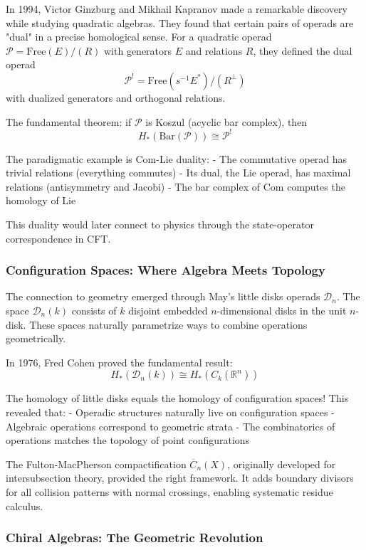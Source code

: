 In 1994, Victor Ginzburg and Mikhail Kapranov \cite{GK94} made a remarkable discovery while studying quadratic algebras. They found that certain pairs of operads are "dual" in a precise homological sense. For a quadratic operad $\mathcal{P} = \text{Free}(E)/(R)$ with generators $E$ and relations $R$, they defined the dual operad
$$\mathcal{P}^! = \text{Free}(s^{-1}E^*)/(R^\perp)$$
with dualized generators and orthogonal relations.

The fundamental theorem: if $\mathcal{P}$ is Koszul (acyclic bar complex), then
$$H_*(\text{Bar}(\mathcal{P})) \cong \mathcal{P}^!$$

The paradigmatic example is Com-Lie duality:
- The commutative operad has trivial relations (everything commutes)
- Its dual, the Lie operad, has maximal relations (antisymmetry and Jacobi)
- The bar complex of Com computes the homology of Lie

This duality would later connect to physics through the state-operator correspondence in CFT.

\subsubsection{Configuration Spaces: Where Algebra Meets Topology}

The connection to geometry emerged through May's little disks operads $\mathcal{D}_n$. The space $\mathcal{D}_n(k)$ consists of $k$ disjoint embedded $n$-dimensional disks in the unit $n$-disk. These spaces naturally parametrize ways to combine operations geometrically.

In 1976, Fred Cohen \cite{Coh76} proved the fundamental result:
$$H_*(\mathcal{D}_n(k)) \cong H_*(C_k(\mathbb{R}^n))$$

The homology of little disks equals the homology of configuration spaces! This revealed that:
- Operadic structures naturally live on configuration spaces
- Algebraic operations correspond to geometric strata
- The combinatorics of operations matches the topology of point configurations

The Fulton-MacPherson compactification $\overline{C}_n(X)$, originally developed for intersubsection theory, provided the right framework. It adds boundary divisors for all collision patterns with normal crossings, enabling systematic residue calculus.

\subsubsection{Chiral Algebras: The Geometric Revolution}

